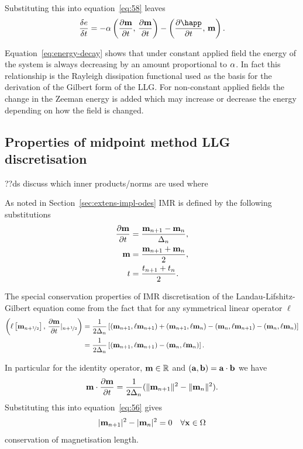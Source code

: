 Substituting this into equation~\eqref{eq:58} leaves
\begin{equation}
  \label{eq:energy-decay}
  \vd{\e}{t} = -\dampc \ip{\dmdt}{\dmdt} - \ip{\pd{\happ}{t}}{\mv}.
\end{equation}

Equation~\eqref{eq:energy-decay} shows that under constant applied field the energy of the system is always decreasing by an amount proportional to $\alpha$.
In fact this relationship is the Rayleigh dissipation functional used as the basis for the derivation of the Gilbert form of the LLG.\cite{Gilbert2004}
For non-constant applied fields the change in the Zeeman energy is added which may increase or decrease the energy depending on how the field is changed. %


\subsection{Properties of midpoint method LLG discretisation}
\label{sec:prop-midp-meth}

??ds discuss which inner products/norms are used where

As noted in Section~\ref{sec:extens-impl-odes} IMR is defined by the following substitutions
\begin{align}
  \label{eq:55}
  \frac{\partial \mathbf{m}}{\partial t} &= \frac{\mathbf{m}_{n+1} - \mathbf{m}_n}{\Delta_{n}}, \\
  \mathbf{m} &= \frac{\mathbf{m}_{n+1} + \mathbf{m}_n}{2}, \\
  t &=  \frac{t_{n+1} + t_n}{2}.
\end{align}

The special conservation properties of IMR discretisation of the Landau-Lifshitz-Gilbert equation come from the fact that for any symmetrical linear operator $\ell$
\begin{align}
  \label{eq:54}
  \left(\ell \left[ \mathbf{m}_{n+\nicefrac{1}{2}} \right],\,  \frac{\partial \mathbf{m}}{\partial t} \lvert_{n+\nicefrac{1}{2}} \right)
  &= \frac{1}{2\Delta_{n}} \left[
    (\mathbf{m}_{n+1} , \ell \mathbf{m}_{n+1})
    + (\mathbf{m}_{n+1} , \ell \mathbf{m}_{n})
    - (\mathbf{m}_{n} , \ell \mathbf{m}_{n+1})
    - (\mathbf{m}_{n} , \ell \mathbf{m}_{n})
    \right] \notag\\
  &= \frac{1}{2\Delta_{n}} \left[
    (\mathbf{m}_{n+1} , \ell \mathbf{m}_{n+1})
    - (\mathbf{m}_{n} , \ell \mathbf{m}_{n})
    \right].
\end{align}

In particular for the identity operator, $\mathbf{m} \in \mathbb{R}$ and $({\mathbf{a}}, {\mathbf{b}}) = {\mathbf{a}} \cdot {\mathbf{b}}$ we have
\begin{equation}
  \label{eq:52}
  \mathbf{m} \cdot \frac{\partial \mathbf{m}}{\partial t}  = \frac{1}{2\Delta_{n}} (\lVert \mathbf{m}_{n+1} \rVert^2 - \lVert \mathbf{m}_{n} \rVert^2 ).
\end{equation}
Substituting this into equation~\eqref{eq:56} gives
\begin{equation}
  \lvert \mathbf{m}_{n+1}  \rvert^2 - \lvert \mathbf{m}_{n} \rvert^2 = 0 \quad \forall \mathbf{x} \in \Omega
\end{equation}
\ie conservation of magnetisation length.

